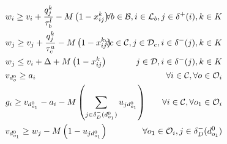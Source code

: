 \documentclass{article}
\begin{document}
\begin{alignat}{3}
    \label{mod:c5}         & w_{i} \geq v_{i}  + \frac{q^k_j}{\tau^l_b} -M\left(1- x^{k}_{ij}\right)                                                                                                                                                                                                                & \hspace{-20mm} \forall  b \in \mathcal{B},  i \in \mathcal{L}_{b},  j \in \delta^{+}(i), k \in K \\
    \label{mod:c6}         & w_{j} \geq v_{j}  + {  \frac{q^k_j}{\tau^u_c} -M\left(1- x^{k}_{ij}\right) }                                                                                                                                                                                                           & \hspace{-20mm}  \forall c \in  \mathcal{C}, j \in \mathcal{D}_{c}, i \in \delta^{-}(j),  k \in K \\
    \label{mod:c7}         & w_{j} \leq v_{i}  + \Delta + M\left(1- x^{k}_{ij}\right)                                                                                                                                                                                                                               & \hspace{-20mm}   j \in \mathcal{D},  i \in \delta^{-}(j),  k \in K                               \\
    \label{mod:c8}         & v_{d^0_{o}} \geq a_i                                                                                                                                                                                                                                                                   & \hspace{-20mm} \forall  i \in \mathcal{C}, \forall o \in \mathcal{O}_i                           \\
    \label{mod:c9}         & g_{i} \geq v_{d^0_{o_1}} - a_i - M\left(  \sum_{ j \in \delta^{-}_{D}(d^0_{o_1})  }{u_{jd^0_{o_1}}}\right)                                                                                                                                                                             & \hspace{-20mm}  \forall  i \in \mathcal{C}, \forall o_1 \in \mathcal{O}_i                        \\
    \label{mod:c101}       & v_{d^0_{o_1}} \geq w_j - M\left(1- u_{jd^0_{o_1}}\right)                                                                                                                                                                                                                               & \hspace{-40mm}    \forall o_1 \in \mathcal{O}_i,  j \in \delta_{D}^{-}(d^0_{o_1})                \\

\end{alignat}
\end{document}
